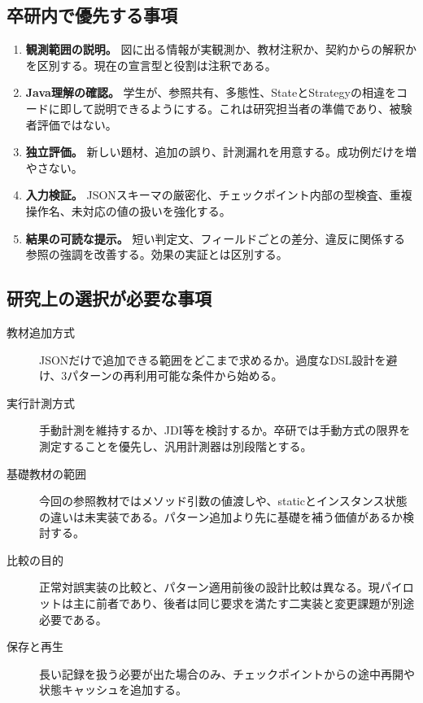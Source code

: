 \documentclass[a4paper,11pt]{ltjsarticle}
\begin{document}
\subsection{卒研内で優先する事項}
\begin{enumerate}
\item \textbf{観測範囲の説明。} 図に出る情報が実観測か、教材注釈か、契約からの解釈かを区別する。現在の宣言型と役割は注釈である。
\item \textbf{Java理解の確認。} 学生が、参照共有、多態性、StateとStrategyの相違をコードに即して説明できるようにする。これは研究担当者の準備であり、被験者評価ではない。
\item \textbf{独立評価。} 新しい題材、追加の誤り、計測漏れを用意する。成功例だけを増やさない。
\item \textbf{入力検証。} JSONスキーマの厳密化、チェックポイント内部の型検査、重複操作名、未対応の値の扱いを強化する。
\item \textbf{結果の可読な提示。} 短い判定文、フィールドごとの差分、違反に関係する参照の強調を改善する。効果の実証とは区別する。
\end{enumerate}

\subsection{研究上の選択が必要な事項}
\begin{description}
\item[教材追加方式] JSONだけで追加できる範囲をどこまで求めるか。過度なDSL設計を避け、3パターンの再利用可能な条件から始める。
\item[実行計測方式] 手動計測を維持するか、JDI等を検討するか。卒研では手動方式の限界を測定することを優先し、汎用計測器は別段階とする。
\item[基礎教材の範囲] 今回の参照教材ではメソッド引数の値渡しや、staticとインスタンス状態の違いは未実装である。パターン追加より先に基礎を補う価値があるか検討する。
\item[比較の目的] 正常対誤実装の比較と、パターン適用前後の設計比較は異なる。現パイロットは主に前者であり、後者は同じ要求を満たす二実装と変更課題が別途必要である。
\item[保存と再生] 長い記録を扱う必要が出た場合のみ、チェックポイントからの途中再開や状態キャッシュを追加する。
\end{description}
\end{document}
